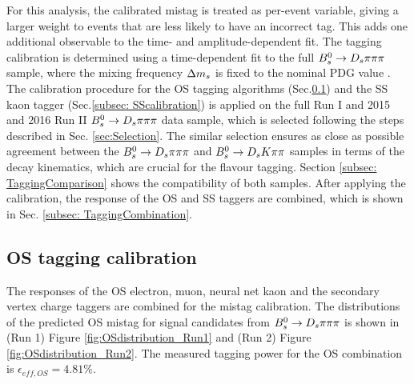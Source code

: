 For this analysis, the calibrated mistag is treated as per-event variable, giving a larger weight to events that are less likely to have an incorrect tag. 
This adds one additional observable to the time- and amplitude-dependent fit. \newline
The tagging calibration is determined using a time-dependent fit to the full ${{B}^0_{s}}\rightarrow{\ensuremath{{D}_{s}}}{\ensuremath{\pi}}{\ensuremath{\pi}}{\ensuremath{\pi}}$ sample, where the mixing frequency ${\Delta m_{{s}}}$ is fixed to the nominal PDG value \cite{PDG2014}.
The calibration procedure for the OS tagging algorithms (Sec.\ref{subsec: OScalibration}) and 
the SS kaon tagger (Sec.\ref{subsec: SScalibration}) is applied on the full Run I and 2015 and 2016 Run II ${{B}^0_{s}}\rightarrow{\ensuremath{{D}_{s}}}{\ensuremath{\pi}}{\ensuremath{\pi}}{\ensuremath{\pi}}$ data sample, which is selected following the steps described in Sec. \ref{sec:Selection}.
The similar selection ensures as close as possible agreement between the ${{B}^0_{s}}\rightarrow{\ensuremath{{D}_{s}}}{\ensuremath{\pi}}{\ensuremath{\pi}}{\ensuremath{\pi}}$ and ${{B}^0_{s}}\rightarrow{\ensuremath{{D}_{s}}}{\ensuremath{K}}{\ensuremath{\pi}}{\ensuremath{\pi}}$ samples in terms of the decay kinematics, which are crucial for the flavour tagging.
Section \ref{subsec: TaggingComparison} shows the compatibility of both samples. After applying the calibration, the response of the OS and SS taggers are combined, which is shown in Sec. \ref{subsec: TaggingCombination}.  



\subsection{OS tagging calibration}
\label{subsec: OScalibration}
The responses of the OS electron, muon, neural net kaon and the secondary vertex charge taggers are combined for the mistag calibration. 
The distributions of the predicted OS mistag for signal candidates from ${{B}^0_{s}}\rightarrow{\ensuremath{{D}_{s}}}{\ensuremath{\pi}}{\ensuremath{\pi}}{\ensuremath{\pi}}$ is shown in (Run 1) Figure \ref{fig:OSdistribution_Run1} and (Run 2) Figure \ref{fig:OSdistribution_Run2}.  
The measured tagging power for the OS combination is $\epsilon_{eff,OS} = 4.81 \%$.


